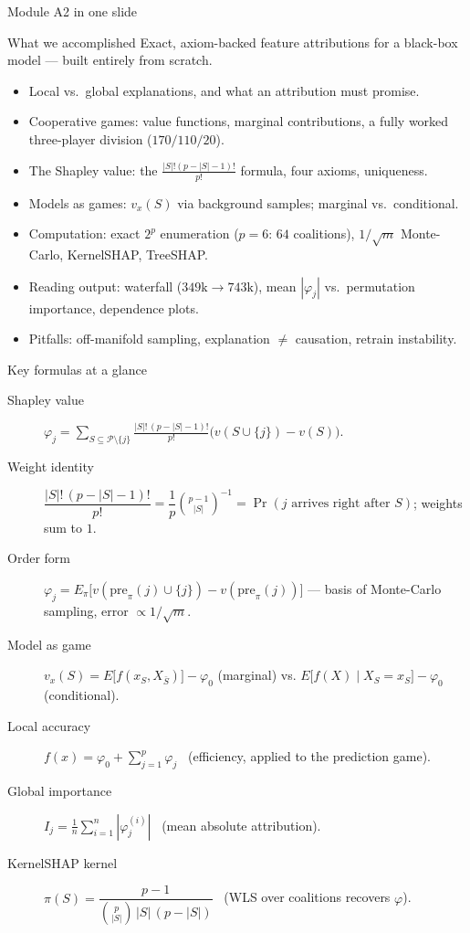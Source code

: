 \documentclass[aspectratio=169,11pt]{beamer}
\begin{document}
\begin{frame}{Module A2 in one slide}
  \begin{block}{What we accomplished}
    Exact, axiom-backed feature attributions for a black-box model --- built
    entirely from scratch.
  \end{block}
  \begin{itemize}
    \item Local vs.\ global explanations, and what an attribution must promise.
    \item Cooperative games: value functions, marginal contributions, a fully
          worked three-player division ($170/110/20$).
    \item The Shapley value: the $\frac{|S|!(p-|S|-1)!}{p!}$ formula, four axioms,
          uniqueness.
    \item Models as games: $v_x(S)$ via background samples; marginal vs.\
          conditional.
    \item Computation: exact $2^p$ enumeration ($p=6$: $64$ coalitions),
          $1/\sqrt{m}$ Monte-Carlo, KernelSHAP, TreeSHAP.
    \item Reading output: waterfall ($349\text{k}\to743\text{k}$), mean
          $|\varphi_j|$ vs.\ permutation importance, dependence plots.
    \item Pitfalls: off-manifold sampling, explanation $\neq$ causation,
          retrain instability.
  \end{itemize}
\end{frame}

\begin{frame}{Key formulas at a glance}
  \footnotesize
  \begin{description}
    \item[Shapley value] $\varphi_j=\displaystyle\sum_{S\subseteq\mathcal{P}\setminus\{j\}}
      \frac{|S|!\,(p-|S|-1)!}{p!}\bigl(v(S\cup\{j\})-v(S)\bigr)$.
    \item[Weight identity] $\dfrac{|S|!\,(p-|S|-1)!}{p!} = \dfrac1p\binom{p-1}{|S|}^{-1}
      = \Pr(\text{$j$ arrives right after }S)$; weights sum to $1$.
    \item[Order form] $\varphi_j = E_\pi\bigl[v(\mathrm{pre}_\pi(j)\cup\{j\})
      - v(\mathrm{pre}_\pi(j))\bigr]$ --- basis of Monte-Carlo sampling, error
      $\propto 1/\sqrt{m}$.
    \item[Model as game] $v_x(S) = E\bigl[f(x_S, X_{\bar S})\bigr] - \varphi_0$
      (marginal) \;vs.\; $E\bigl[f(X)\mid X_S=x_S\bigr] - \varphi_0$ (conditional).
    \item[Local accuracy] $f(x) = \varphi_0 + \sum_{j=1}^p \varphi_j$ \ (efficiency,
      applied to the prediction game).
    \item[Global importance] $I_j = \frac1n\sum_{i=1}^n |\varphi_j^{(i)}|$ \ (mean
      absolute attribution).
    \item[KernelSHAP kernel] $\pi(S) = \dfrac{p-1}{\binom{p}{|S|}\,|S|\,(p-|S|)}$ \
      (WLS over coalitions recovers $\varphi$).
  \end{description}
\end{frame}
\end{document}

